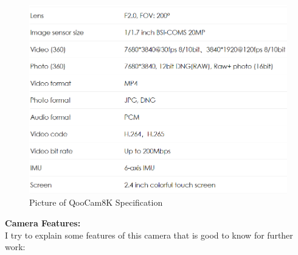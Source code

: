 \begin{figure}[H]
  \centering
  \includegraphics[width= 1.0\textwidth]{Figures/QooCam8KSPEC.PNG}
  \caption[Picture of QooCam8K Specification]{Picture of QooCam8K Specification \cite{QooCam8KSPEC}}
  \label{fig:QooCam8K Specification}
\end{figure}
 \textbf{Camera Features:} \\
I try to explain some features of this camera that is good to know for further work:
